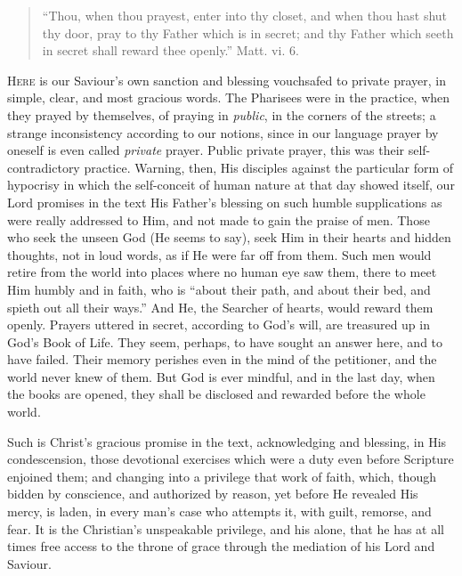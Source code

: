 
\begin{quote}

``Thou, when thou prayest, enter into thy
closet, and when thou hast shut thy door, pray to thy
Father which is in secret; and thy Father which seeth
in secret shall reward thee openly.'' Matt. vi.
6.

\end{quote}

H\textsc{ere} is our Saviour's own sanction and blessing
vouchsafed to private prayer, in simple, clear, and most
gracious words. The Pharisees were in the practice, when
they prayed by themselves, of praying in \emph{public},
in the corners of the streets; a strange inconsistency
according to our notions, since in our language prayer by
oneself is even called \emph{private} prayer. Public
private prayer, this was their self-contradictory
practice. Warning, then, His disciples against the
particular form of hypocrisy in which the self-conceit of
human nature at that day showed itself, our Lord promises
in the text His Father's blessing on such humble
supplications as were really addressed to Him, and not
made to gain the praise of men. Those who seek the unseen
God (He seems to say), seek Him in their hearts and
hidden thoughts, not in loud words, as if He were far off
from them. Such men would retire from the world into
places where no human eye saw them, there to meet Him
humbly and in faith, who is ``about their path, and
about their bed, and spieth out all their ways.'' And
He, the Searcher of hearts, would reward them openly.
Prayers uttered in secret, according to God's will, are
treasured up in God's Book of Life. They seem, perhaps,
to have sought an answer here, and to have failed. Their
memory perishes even in the mind of the petitioner, and
the world never knew of them. But God is ever mindful,
and in the last day, when the books are opened, they
shall be disclosed and rewarded before the whole world.

Such is Christ's gracious promise in the text,
acknowledging and blessing, in His condescension, those
devotional exercises which were a duty even before
Scripture enjoined them; and changing into a privilege
that work of faith, which, though bidden by conscience,
and authorized by reason, yet before He revealed His
mercy, is laden, in every man's case who attempts it,
with guilt, remorse, and fear. It is the Christian's
unspeakable privilege, and his alone, that he has at all
times free access to the throne of grace through the
mediation of his Lord and Saviour.

